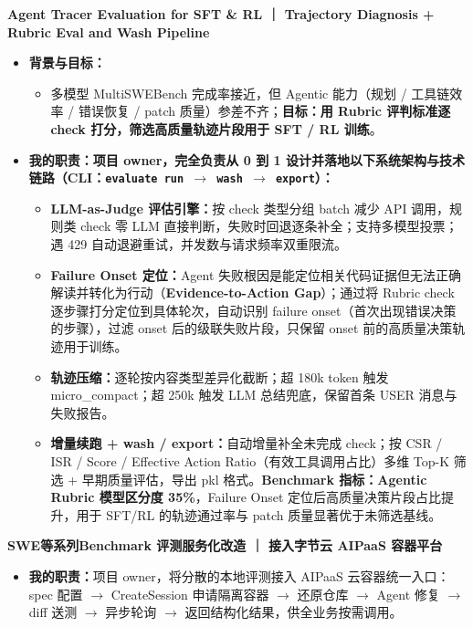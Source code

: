 \documentclass[12pt,a3paper,fontset=none]{ctexart}
\newcommand{\code}[1]{\texttt{\fontsize{10.8pt}{12pt}\selectfont #1}}
\newcommand{\ProjectTitle}[1]{%
  \needspace{2\baselineskip}
  {\color{TitleBlue}\fontsize{13.5pt}{16pt}\selectfont\bfseries #1}\par
  \vspace{0.2mm}
}
\begin{document}
\ProjectTitle{Agent Tracer Evaluation for SFT \& RL ｜ Trajectory Diagnosis + Rubric Eval and Wash Pipeline}
\begin{itemize}
  \item \textbf{背景与目标：}
  \begin{itemize}
    \item 多模型 MultiSWEBench 完成率接近，但 Agentic 能力（规划 / 工具链效率 / 错误恢复 / patch 质量）参差不齐；\textbf{目标：用 Rubric 评判标准逐 check 打分，筛选高质量轨迹片段用于 SFT / RL 训练}。
  \end{itemize}
  \item \textbf{我的职责：项目 owner，完全负责从 0 到 1 设计并落地以下系统架构与技术链路（CLI：\code{evaluate run $\rightarrow$ wash $\rightarrow$ export}）：}
  \begin{itemize}
    \item \textbf{LLM-as-Judge 评估引擎：}按 check 类型分组 batch 减少 API 调用，规则类 check 零 LLM 直接判断，失败时回退逐条补全；支持多模型投票；遇 429 自动退避重试，并发数与请求频率双重限流。
    \item \textbf{Failure Onset 定位：}Agent 失败根因是能定位相关代码证据但无法正确解读并转化为行动（\textbf{Evidence-to-Action Gap}）；通过将 Rubric check 逐步骤打分定位到具体轮次，自动识别 failure onset（首次出现错误决策的步骤），过滤 onset 后的级联失败片段，只保留 onset 前的高质量决策轨迹用于训练。
    \item \textbf{轨迹压缩：}逐轮按内容类型差异化截断；超 180k token 触发 micro\_compact；超 250k 触发 LLM 总结兜底，保留首条 USER 消息与失败报告。
    \item \textbf{增量续跑 + wash / export：}自动增量补全未完成 check；按 CSR / ISR / Score / Effective Action Ratio（有效工具调用占比）多维 Top-K 筛选 + 早期质量评估，导出 pkl 格式。\textbf{Benchmark 指标：Agentic Rubric 模型区分度 35\%}，Failure Onset 定位后高质量决策片段占比提升，用于 SFT/RL 的轨迹通过率与 patch 质量显著优于未筛选基线。
  \end{itemize}
\end{itemize}

\ProjectTitle{SWE等系列Benchmark 评测服务化改造 ｜ 接入字节云 AIPaaS 容器平台}
\begin{itemize}
  \item \textbf{我的职责：}项目 owner，将分散的本地评测接入 AIPaaS 云容器统一入口：spec 配置 $\rightarrow$ CreateSession 申请隔离容器 $\rightarrow$ 还原仓库 $\rightarrow$ Agent 修复 $\rightarrow$ diff 送测 $\rightarrow$ 异步轮询 $\rightarrow$ 返回结构化结果，供全业务按需调用。
\end{itemize}
\end{document}
